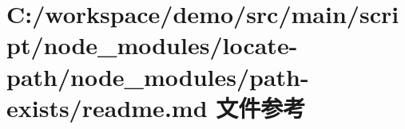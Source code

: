 \hypertarget{node__modules_2locate-path_2node__modules_2path-exists_2_r_e_a_d_m_e_8md}{}\section{C\+:/workspace/demo/src/main/script/node\+\_\+modules/locate-\/path/node\+\_\+modules/path-\/exists/readme.md 文件参考}
\label{node__modules_2locate-path_2node__modules_2path-exists_2_r_e_a_d_m_e_8md}
